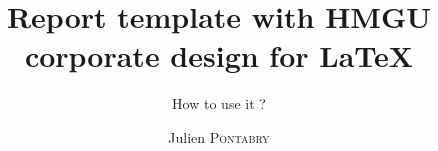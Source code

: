 %
%



\title{Report template with HMGU corporate design for \LaTeX{}}
\subtitle{How to use it ?}
\author{Julien \textsc{Pontabry}}


	\maketitle


